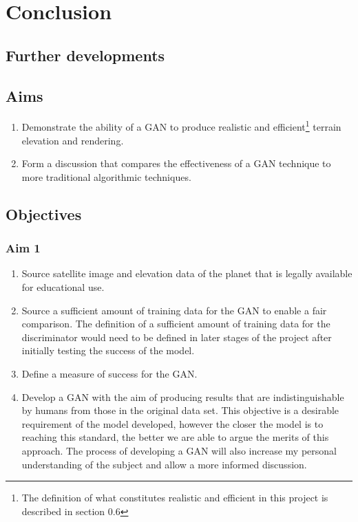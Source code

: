 \documentclass[a4paper]{report}
\begin{document}
\section{Conclusion}
\subsection{Further developments}
\appendix
\renewcommand\bibname{References}


\begin{appendices}
\subsection{Aims}
\begin{enumerate}
    \item Demonstrate the ability of a GAN to produce realistic and efficient\footnote{The definition of what constitutes realistic and efficient in this project is described in section 0.6} terrain elevation and rendering.
    \item Form a discussion that compares the effectiveness of a GAN technique to more traditional algorithmic techniques.
\end{enumerate}
\subsection{Objectives}
\subsubsection{Aim 1}
\begin{enumerate}
\renewcommand{\theenumi}{\alph{enumi}}
    \item Source satellite image and elevation data of the planet that is legally available for educational use.
    \item Source a sufficient amount of training data for the GAN to enable a fair comparison. The definition of a sufficient amount of training data for the discriminator would need to be defined in later stages of the project after initially testing the success of the model.
    \item Define a measure of success for the GAN.
    \item Develop a GAN with the aim of producing results that are indistinguishable by humans from those in the original data set. This objective is a desirable requirement of the model developed, however the closer the model is to reaching this standard, the better we are able to argue the merits of this approach. The process of developing a GAN will also increase my personal understanding of the subject and allow a more informed discussion.
\end{enumerate}

\end{appendices}
\end{document}
